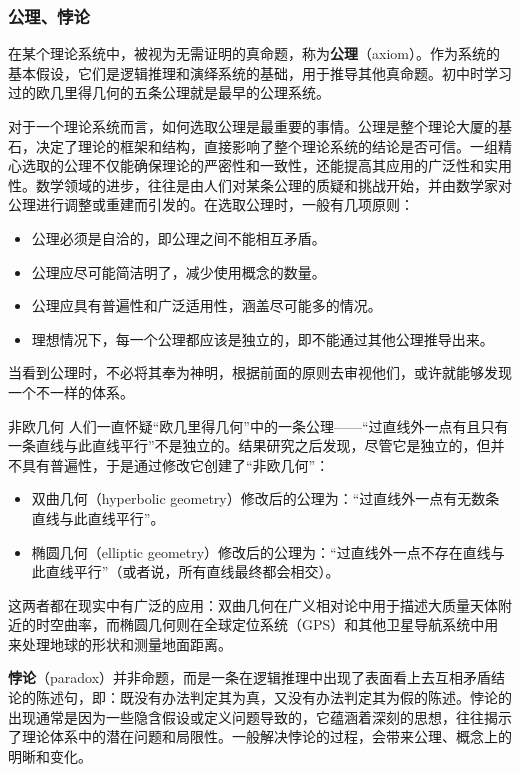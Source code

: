 \subsubsection{公理、悖论}

在某个理论系统中，被视为无需证明的真命题，称为\textbf{公理}（axiom）。作为系统的基本假设，它们是逻辑推理和演绎系统的基础，用于推导其他真命题。初中时学习过的欧几里得几何的五条公理就是最早的公理系统。

对于一个理论系统而言，如何选取公理是最重要的事情。公理是整个理论大厦的基石，决定了理论的框架和结构，直接影响了整个理论系统的结论是否可信。一组精心选取的公理不仅能确保理论的严密性和一致性，还能提高其应用的广泛性和实用性。数学领域的进步，往往是由人们对某条公理的质疑和挑战开始，并由数学家对公理进行调整或重建而引发的。在选取公理时，一般有几项原则：

\begin{itemize}
\item 公理必须是自洽的，即公理之间不能相互矛盾。
\item 公理应尽可能简洁明了，减少使用概念的数量。
\item 公理应具有普遍性和广泛适用性，涵盖尽可能多的情况。
\item 理想情况下，每一个公理都应该是独立的，即不能通过其他公理推导出来。
\end{itemize}

当看到公理时，不必将其奉为神明，根据前面的原则去审视他们，或许就能够发现一个不一样的体系。

\begin{example}{非欧几何}
人们一直怀疑“欧几里得几何”中的一条公理——“过直线外一点有且只有一条直线与此直线平行”不是独立的。结果研究之后发现，尽管它是独立的，但并不具有普遍性，于是通过修改它创建了“非欧几何”：

\begin{itemize}
\item 双曲几何（hyperbolic geometry）修改后的公理为：“过直线外一点有无数条直线与此直线平行”。
\item 椭圆几何（elliptic geometry）修改后的公理为：“过直线外一点不存在直线与此直线平行”（或者说，所有直线最终都会相交）。
\end{itemize}

这两者都在现实中有广泛的应用：双曲几何在广义相对论中用于描述大质量天体附近的时空曲率，而椭圆几何则在全球定位系统（GPS）和其他卫星导航系统中用来处理地球的形状和测量地面距离。
\end{example}

\textbf{悖论}（paradox）并非命题，而是一条在逻辑推理中出现了表面看上去互相矛盾结论的陈述句，即：既没有办法判定其为真，又没有办法判定其为假的陈述。悖论的出现通常是因为一些隐含假设或定义问题导致的，它蕴涵着深刻的思想，往往揭示了理论体系中的潜在问题和局限性。一般解决悖论的过程，会带来公理、概念上的明晰和变化。


